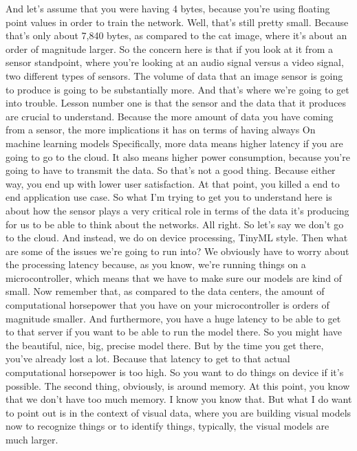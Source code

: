   And let's assume that you were having 4 bytes,
  because you're using floating point values in order to train the network.
  Well, that's still pretty small.
  Because that's only about 7,840 bytes, as
  compared to the cat image, where it's about an order of magnitude larger.
  So the concern here is that if you look at it from a sensor standpoint,
  where you're looking at an audio signal versus a video signal, two
  different types of sensors.
  The volume of data that an image sensor is going to produce
  is going to be substantially more.
  And that's where we're going to get into trouble.
  Lesson number one is that the sensor and the data that it produces
  are crucial to understand.
  Because the more amount of data you have coming
  from a sensor, the more implications it has on terms of having always
  On machine learning models
  Specifically, more data means higher latency
  if you are going to go to the cloud.
  It also means higher power consumption, because you're
  going to have to transmit the data.
  So that's not a good thing.
  Because either way, you end up with lower user satisfaction.
  At that point, you killed a end to end application use case.
  So what I'm trying to get you to understand here
  is about how the sensor plays a very critical role in terms of the data
  it's producing for us to be able to think about the networks.
  All right.
  So let's say we don't go to the cloud.
  And instead, we do on device processing, TinyML style.
  Then what are some of the issues we're going to run into?
  We obviously have to worry about the processing latency
  because, as you know, we're running things
  on a microcontroller, which means that we have to make
  sure our models are kind of small.
  Now remember that, as compared to the data
  centers, the amount of computational horsepower
  that you have on your microcontroller is orders of magnitude smaller.
  And furthermore, you have a huge latency to be able to get to that server
  if you want to be able to run the model there.
  So you might have the beautiful, nice, big, precise model there.
  But by the time you get there, you've already lost a lot.
  Because that latency to get to that actual computational horsepower
  is too high.
  So you want to do things on device if it's possible.
  The second thing, obviously, is around memory.
  At this point, you know that we don't have too much memory.
  I know you know that.
  But what I do want to point out is in the context of visual data,
  where you are building visual models now to recognize things
  or to identify things, typically, the visual models are much larger.

